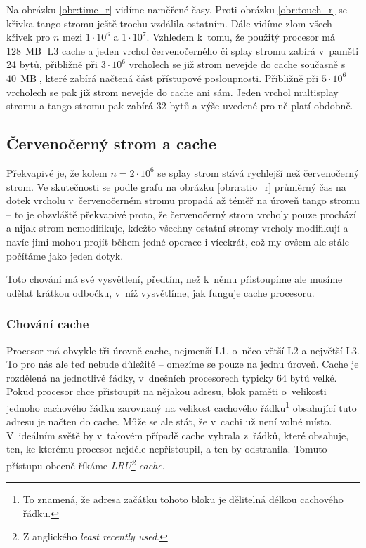 
Na obrázku \ref{obr:time_r} vidíme naměřené časy. Proti obrázku \ref{obr:touch_r}
se křivka tango stromu ještě trochu vzdálila ostatním. Dále vidíme zlom všech
křivek pro $n$ mezi $1\cdot10^6$ a $1\cdot 10^7$. Vzhledem k~tomu, že použitý
procesor má $128\,\operatorname{MB}$ L3 cache a jeden vrchol  červenočerného či
splay stromu zabírá v~paměti 24 bytů, přibližně při $3\cdot 10^6$ vrcholech se již
strom nevejde do cache současně s~$40\,\operatorname{MB}$, které zabírá načtená
část přístupové posloupnosti. Přibližně při $5\cdot10^6$ vrcholech se pak již strom nevejde do cache ani sám.
Jeden vrchol multisplay stromu a tango stromu pak zabírá 32 bytů a výše uvedené pro ně platí obdobně. 


\subsection{Červenočerný strom a cache}\label{sec:rb_and_cache}

Překvapivé je, že kolem $n=2\cdot10^6$ se splay strom stává rychlejší než
červenočerný strom. Ve skutečnosti se podle grafu na obrázku \ref{obr:ratio_r}
průměrný čas na dotek vrcholu v~červenočerném stromu propadá až téměř na úroveň tango
stromu -- to je obzvláště překvapivé proto, že červenočerný strom vrcholy pouze
prochází a nijak strom nemodifikuje, kdežto všechny ostatní stromy vrcholy
modifikují a navíc jimi mohou projít během jedné operace i vícekrát, což my
ovšem ale stále počítáme jako jeden dotyk.

Toto chování má své vysvětlení, předtím, než k~němu přistoupíme ale musíme
udělat krátkou odbočku, v~níž vysvětlíme, jak funguje cache procesoru.

\subsubsection{Chování cache}

Procesor má obvykle tři úrovně cache, nejmenší L1, o~něco větší L2 a největší
L3. To pro nás ale teď nebude důležité -- omezíme se pouze na jednu úroveň.
Cache je rozdělená na jednotlivé řádky, v~dnešních procesorech typicky 64 bytů
velké. Pokud procesor chce přistoupit na nějakou adresu, blok paměti
o~velikosti jednoho cachového řádku zarovnaný na velikost cachového
řádku\footnote{To znamená, že adresa začátku tohoto bloku je dělitelná délkou
cachového řádku.} obsahující tuto adresu je načten do cache. Může se ale stát,
že v~cachi už není volné místo. V~ideálním světě by v~takovém případě cache
vybrala z~řádků, které obsahuje, ten, ke kterému procesor nejdéle nepřistoupil,
a ten by odstranila. Tomuto přístupu obecně říkáme \emph{LRU\footnote{Z
anglického \emph{least recently used}.} cache}.

